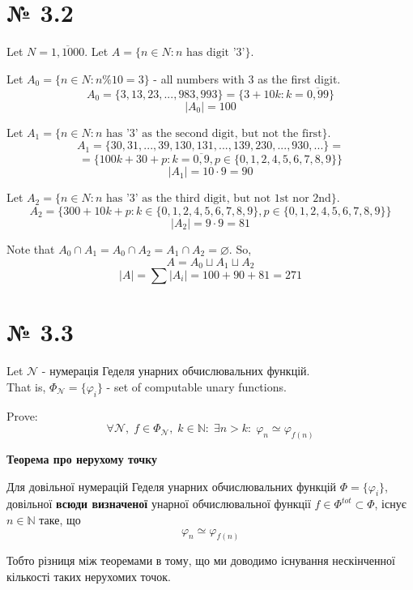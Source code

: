 \documentclass[11pt, a4paper]{article} %
\begin{document}
\section*{№ 3.2}
Let $N = \overline{1,1000}$.
Let $A = \{n\in N : n \text{ has digit '3'}\}$.

Let $A_0 = \{n \in N : n \% 10 = 3\}$ - all numbers with $3$ as the first digit.
$$A_0 = \{3,13,23,...,983,993\} = \{3 + 10k : k=\overline{0,99}\}$$
$$|A_0| = 100$$

Let $A_1 = \{n \in N : n \text{ has '3' as the second digit, but not the first}\}$.
$$A_1 = \{30, 31, ..., 39, 130, 131, ..., 139, 230, ..., 930, ...\} =$$
$$= \{100k + 30 + p : k=\overline{0,9}, p\in\{0,1,2,4,5,6,7,8,9\}\}$$
$$|A_1| = 10\cdot 9 = 90$$

Let $A_2 = \{n \in N : n \text{ has '3' as the third digit, but not 1st nor 2nd}\}$.
$$A_2 = \{300 + 10k + p : k\in\{0,1,2,4,5,6,7,8,9\}, p\in\{0,1,2,4,5,6,7,8,9\}\}$$
$$|A_2| = 9\cdot 9 = 81$$

Note that $A_0 \cap A_1 = A_0 \cap A_2 = A_1 \cap A_2 = \varnothing$. So,
$$A = A_0 \sqcup A_1 \sqcup A_2$$
$$|A| = \sum |A_i| = 100 + 90 + 81 = 271$$

\section*{№ 3.3}
\begin{mdframed}
    Let $\mathcal N$ - нумерація Геделя унарних обчислювальних функцій.\\
    That is, $\Phi_{\mathcal N} = \{\varphi_i\}$ - set of computable unary functions.

    Prove:
    $$\forall \mathcal N,\; f \in \Phi_\mathcal N,\; k\in \mathbb N:\; \exists n>k:\; \varphi_n \simeq \varphi_{f(n)}$$
\end{mdframed}


\begin{mdframed}[backgroundcolor=violet!25]
    \textbf{\Large Теорема про нерухому точку}

    Для довільної нумерацій Геделя унарних обчислювальних функцій $\Phi = \{\varphi_i\}$,
    довільної \textbf{всюди визначеної} унарної обчислювальної функції $f \in \Phi^{tot} \subset \Phi$, існує $n \in \mathbb N$ таке, що
    $$\varphi_n \simeq \varphi_{f(n)}$$
\end{mdframed}

Тобто різниця між теоремами в тому, що ми доводимо існування нескінченної кількості таких нерухомих точок.
\pagebreak
\end{document}
